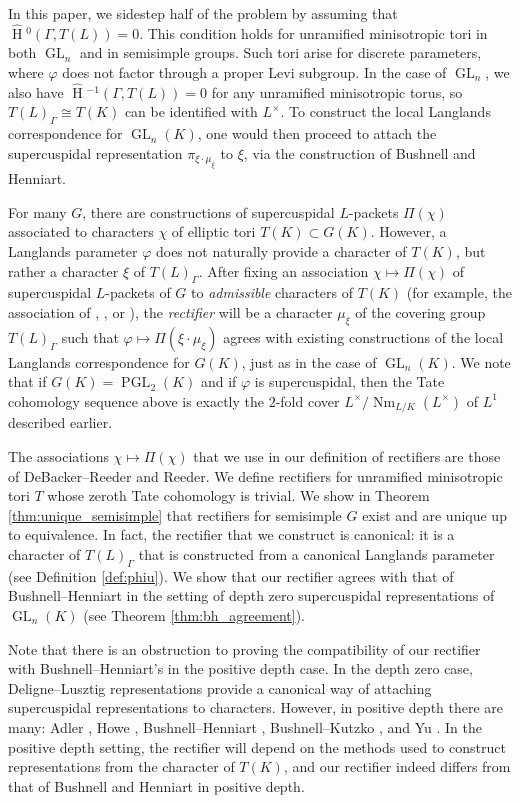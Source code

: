 \documentclass{mrlart7}
\theoremstyle{plain}
\newcommand{\HT}[1]{\hat{\HH}{}^{#1}}
\theoremstyle{definition}
\numberwithin{equation}{section}
\DeclareMathOperator{\HH}{H}
\DeclareMathOperator{\Nm}{Nm}
\DeclareMathOperator{\GL}{GL}
\DeclareMathOperator{\PGL}{PGL}
\newcommand{\Lx}{L^\times}
\begin{document}
In this paper, we sidestep half of the problem by assuming that $\HT{0}(\Gamma, T(L)) = 0$.  This condition holds for unramified minisotropic tori in both $\GL_n$
and in semisimple groups.  Such tori arise for discrete parameters, where $\varphi$ does not factor through a proper Levi subgroup.  In the case of $\GL_n$, we also have $\HT{-1}(\Gamma, T(L)) = 0$
for any unramified minisotropic torus, so $T(L)_{\Gamma} \cong T(K)$ can be identified with $L^{\times}$.  To construct the local Langlands
correspondence for $\GL_n(K)$, one would then proceed to
attach the supercuspidal representation $\pi_{\xi \cdot \mu_{\xi}}$ to $\xi$, via the construction of Bushnell and Henniart.

For many $G$,
there are constructions of supercuspidal $L$-packets
$\Pi(\chi)$ associated to characters $\chi$ of elliptic tori $T(K) \subset G(K)$.  However, a Langlands parameter $\varphi$ does not naturally
provide a character of $T(K)$, but rather a character $\xi$ of
$T(L)_{\Gamma}$.  After fixing an association $\chi \mapsto \Pi(\chi)$ of supercuspidal $L$-packets of $G$
to \emph{admissible} characters of $T(K)$ (for example, the association of \cite{reeder-debacker:09a}, \cite{kaletha:13a}, or \cite{reeder:08a}), the \emph{rectifier} will be a character
$\mu_{\xi}$ of the covering group $T(L)_{\Gamma}$ such that $\varphi \mapsto \Pi(\xi \cdot \mu_{\xi})$
agrees with existing constructions of the local Langlands correspondence for $G(K)$, just as in the case of $\GL_n(K)$.  We note that if $G(K) = \PGL_2(K)$ and if $\varphi$ is supercuspidal, then the Tate cohomology sequence above is exactly the $2$-fold cover $\Lx / \Nm_{L/K}(\Lx)$ of $L^1$ described earlier.

The associations $\chi \mapsto \Pi(\chi)$ that we use in our definition of rectifiers are those of DeBacker--Reeder and Reeder. We define rectifiers for
unramified minisotropic tori $T$ whose zeroth Tate cohomology is trivial.
We show in Theorem \ref{thm:unique_semisimple} that rectifiers for semisimple $G$ exist
and are unique up to equivalence.  In fact, the rectifier that we construct is canonical: it is a character of $T(L)_{\Gamma}$ that is constructed from
a canonical Langlands parameter (see Definition \ref{def:phiu}).  We show that our rectifier agrees with that of Bushnell--Henniart in the setting of depth zero
supercuspidal representations of $\GL_{n}(K)$ (see Theorem \ref{thm:bh_agreement}).

Note that there is an obstruction to proving the compatibility of our rectifier with Bushnell--Henniart's in the positive depth case.
In the depth zero case, Deligne--Lusztig representations provide a canonical way of
attaching supercuspidal representations to characters. However, in positive depth there are many:
Adler \cite{adler:98a}, Howe \cite{howe:77a}, Bushnell--Henniart \cite{bushnell-henniart:10a},
Bushnell--Kutzko \cite{bushnell-kutzko:AdmissibleDual}, and Yu \cite{yu:03a}.
In the positive depth setting, the rectifier will depend on the methods
used to construct representations from the character of $T(K)$, and
our rectifier indeed differs from that of Bushnell and Henniart in positive depth.
\end{document}
